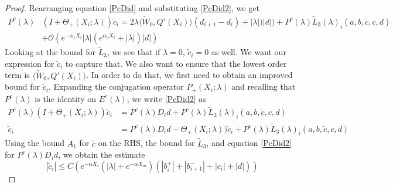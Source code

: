 \documentclass[thesis.tex]{subfiles}
\begin{document}
\begin{lemma}
\begin{proof}
Rearranging equation \eqref{PcDid} and substituting \eqref{PcDid2}, we get
\begin{equation}\label{PcDid3}
\begin{aligned}
P^c(\lambda)&(I + \Theta_+(X_i; \lambda)) \tilde{c}_i = 2 \lambda \langle \tilde{W}_0, Q'(X_i) \rangle (d_{i+1} - d_i ) + |\lambda|)|d|) + P^c(\lambda) \tilde{L}_3(\lambda)_i(a,b,\tilde{c},c,d) \\
&+\mathcal{O}(e^{-\alpha_1 X_i} |\lambda|(e^{\alpha_0 X_i} + |\lambda|)|d|)
\end{aligned}
\end{equation}
Looking at the bound for $\tilde{L}_3$, we see that if $\lambda = 0$, $\tilde{c}_i = 0$ as well. We want our expression for $\tilde{c}_i$ to capture that. We also want to ensure that the lowest order term is $\langle \tilde{W}_0, Q'(X_i) \rangle$. In order to do that, we first need to obtain an improved bound for $\tilde{c}_i$. Expanding the conjugation operator $P_+(X_i; \lambda)$ and recalling that $P^c(\lambda)$ is the identity on $E^c(\lambda)$, we write \eqref{PcDid2} as
\begin{align*}
P^c(\lambda)(I + \Theta_+(X_i; \lambda)) \tilde{c}_i &= P^c(\lambda)D_i d + P^c(\lambda) \tilde{L}_3(
\lambda)_i(a,b,\tilde{c},c,d) \\
\tilde{c}_i &= P^c(\lambda)D_i d - \Theta_+(X_i; \lambda))\tilde{c}_i + P^c(\lambda) \tilde{L}_3(
\lambda)_i(a,b,\tilde{c},c,d)
\end{align*}
Using the bound $A_1$ for $\tilde{c}$ on the RHS, the bound for $\tilde{L}_3$, and equation \eqref{PcDid2} for $P^c(\lambda)D_i d$, we obtain the estimate
\begin{equation}\label{tildecest}
|\tilde{c}_i| \leq C \left( e^{-\alpha X_i}(|\lambda| + e^{-\alpha X_m} )(|b_i^+| + |b_{i+1}^-| + |c_i| + |d|) \right)
\end{equation}


\end{proof}
\end{lemma}
\end{document}
